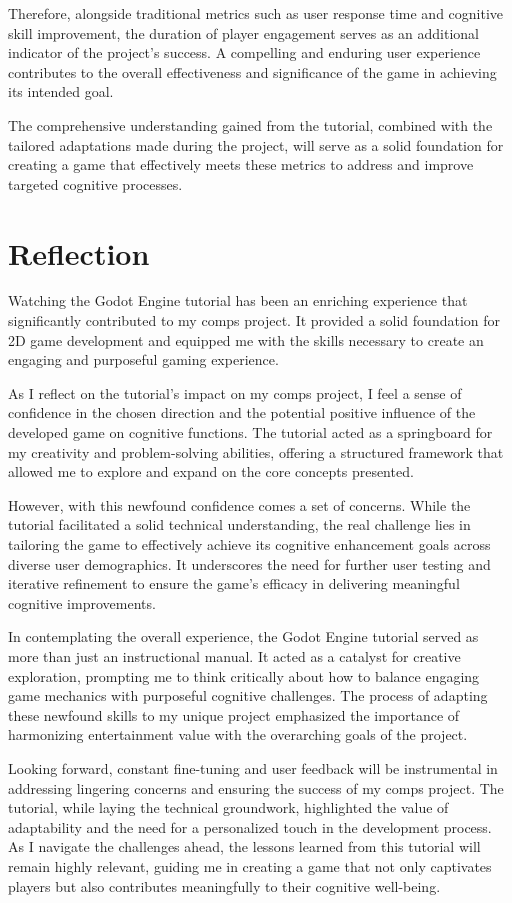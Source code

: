 \documentclass[10pt,twocolumn]{article}
\begin{document}
Therefore, alongside traditional metrics such as user response time and cognitive skill improvement, the duration of player engagement serves as an additional indicator of the project's success. A compelling and enduring user experience contributes to the overall effectiveness and significance of the game in achieving its intended goal.

The comprehensive understanding gained from the tutorial, combined with the tailored adaptations made during the project, will serve as a solid foundation for creating a game that effectively meets these metrics to address and improve targeted cognitive processes.


\section{Reflection}
Watching the Godot Engine tutorial has been an enriching experience that significantly contributed to my comps project. It provided a solid foundation for 2D game development and equipped me with the skills necessary to create an engaging and purposeful gaming experience.

As I reflect on the tutorial's impact on my comps project, I feel a sense of confidence in the chosen direction and the potential positive influence of the developed game on cognitive functions. The tutorial acted as a springboard for my creativity and problem-solving abilities, offering a structured framework that allowed me to explore and expand on the core concepts presented.

However, with this newfound confidence comes a set of concerns. While the tutorial facilitated a solid technical understanding, the real challenge lies in tailoring the game to effectively achieve its cognitive enhancement goals across diverse user demographics. It underscores the need for further user testing and iterative refinement to ensure the game's efficacy in delivering meaningful cognitive improvements.

In contemplating the overall experience, the Godot Engine tutorial served as more than just an instructional manual. It acted as a catalyst for creative exploration, prompting me to think critically about how to balance engaging game mechanics with purposeful cognitive challenges. The process of adapting these newfound skills to my unique project emphasized the importance of harmonizing entertainment value with the overarching goals of the project.

Looking forward, constant fine-tuning and user feedback will be instrumental in addressing lingering concerns and ensuring the success of my comps project. The tutorial, while laying the technical groundwork, highlighted the value of adaptability and the need for a personalized touch in the development process. As I navigate the challenges ahead, the lessons learned from this tutorial will remain highly relevant, guiding me in creating a game that not only captivates players but also contributes meaningfully to their cognitive well-being.
\label{sec:paper}
\end{document}
